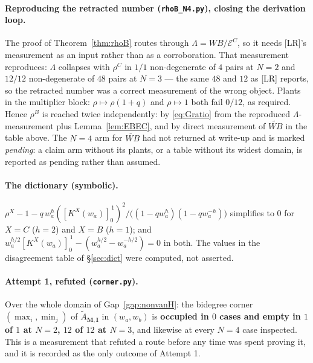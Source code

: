 \documentclass[11pt]{article}
\theoremstyle{plain}
\theoremstyle{definition}
\theoremstyle{remark}
\theoremstyle{plain}
\newcommand{\bI}{\mathbf{I}}
\newcommand{\bM}{\mathbf{M}}
\newcommand{\At}{\widetilde{A}}
\begin{document}
\paragraph{Reproducing the retracted number (\texttt{rhoB\_N4.py}), closing the
derivation loop.}
The proof of Theorem~\ref{thm:rhoB} routes through $\Lambda=WB/\mathcal{E}^C$,
so it needs [LR]'s measurement as an input rather than as a corroboration.  That
measurement reproduces: $\Lambda$ collapses with $\rho^C$ in $1/1$
non-degenerate of $4$ pairs at $N=2$ and $12/12$ non-degenerate of $48$ pairs at
$N=3$ --- the same $48$ and $12$ as [LR] reports, so the retracted number was a
correct measurement of the wrong object.  Plants in the multiplier block:
$\rho\mapsto\rho(1+q)$ and $\rho\mapsto1$ both fail $0/12$, as required.  Hence
$\rho^B$ is reached twice independently: by \eqref{eq:Gratio} from the
reproduced $\Lambda$-measurement plus Lemma~\ref{lem:EBEC}, and by direct
measurement of $\widetilde{WB}$ in the table above.  The $N=4$ arm for
$\widetilde{WB}$ had not returned at write-up and is marked
\emph{pending}: a claim arm without its plants, or a table without its widest
domain, is reported as pending rather than assumed.

\paragraph{The dictionary (symbolic).}
$\rho^X-1-q\,w_a^{h}([K^X(w_a)]_0^{\,1})^2/\bigl((1-qw_a^{h})(1-qw_a^{-h})\bigr)$
simplifies to $0$ for $X=C$ ($h=2$) and $X=B$ ($h=1$); and
$w_a^{h/2}[K^X(w_a)]_0^{\,1}-(w_a^{h/2}-w_a^{-h/2})=0$ in both.  The values in
the disagreement table of \S\ref{sec:dict} were computed, not asserted.

\paragraph{Attempt 1, refuted (\texttt{corner.py}).}
Over the whole domain of Gap~\ref{gap:nonvanH}: the bidegree corner
$(\max_i,\min_j)$ of $\At_{\bM,\bI}$ in $(w_a,w_b)$ is \textbf{occupied in $0$
cases and empty in $1$ of $1$ at $N=2$, $12$ of $12$ at $N=3$}, and likewise at
every $N=4$ case inspected.  This is a measurement that refuted a route before
any time was spent proving it, and it is recorded as the only outcome of
Attempt 1.
\end{document}
